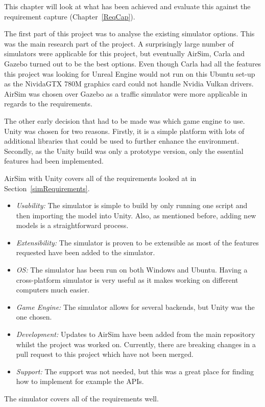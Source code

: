 This chapter will look at what has been achieved and evaluate this against the requirement capture (Chapter~\ref{ReqCap}).

The first part of this project was to analyse the existing simulator options. This was the main research part of the project. A surprisingly large number of simulators were applicable for this project, but eventually AirSim, Carla and Gazebo turned out to be the best options. Even though Carla had all the features this project was looking for Unreal Engine would not run on this Ubuntu set-up as the NividaGTX 780M graphics card could not handle Nvidia Vulkan drivers. AirSim was chosen over Gazebo as a traffic simulator were more applicable in regards to the requirements. 

The other early decision that had to be made was which game engine to use. Unity was chosen for two reasons. Firstly, it is a simple platform with lots of additional libraries that could be used to further enhance the environment. Secondly, as the Unity build was only a prototype version, only the essential features had been implemented.

AirSim with Unity covers all of the requirements looked at in Section~\ref{simRequirements}. 
\begin{itemize}
    \item \emph{Usability:} The simulator is simple to build by only running one script and then importing the model into Unity. Also, as mentioned before, adding new models is a straightforward process. 
    \item \emph{Extensibility:} The simulator is proven to be extensible as most of the features requested have been added to the simulator. 
    \item \emph{OS:} The simulator has been run on both Windows and Ubuntu. Having a cross-platform simulator is very useful as it makes working on different computers much easier. 
    \item \emph{Game Engine:} The simulator allows for several backends, but Unity was the one chosen.
    \item \emph{Development:} Updates to AirSim have been added from the main repository whilst the project was worked on. Currently, there are breaking changes in a pull request to this project which have not been merged. 
    \item \emph{Support:} The support was not needed, but this was a great place for finding how to implement for example the APIs. 
\end{itemize}
The simulator covers all of the requirements well.

